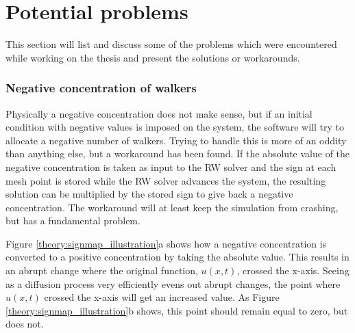\section{Potential problems}\label{problems_and_pitfalls}
 
 This section will list and discuss some of the problems which were encountered while working on the thesis and present the solutions or workarounds.

% 


 
\subsubsection{Negative concentration of walkers}
Physically a negative concentration does not make sense, but if an initial condition with negative values is imposed on the system, the software will try to allocate a negative number of walkers. 
Trying to handle this is more of an oddity than anything else, but a workaround has been found. 
If the absolute value of the negative concentration is taken as input to the RW solver and the sign at each mesh point is stored while the RW solver advances the system, the resulting solution can be multiplied by the stored sign to give back a negative concentration. 
The workaround will at least keep the simulation from crashing, but has a fundamental problem. 

Figure \ref{theory:signmap_illustration}a shows how a negative concentration is converted to a positive concentration by taking the absolute value. This results in an abrupt change where the original function, $u(x,t)$, crossed the x-axis. Seeing as a diffusion process very efficiently evens out abrupt changes, the point where $u(x,t)$ crossed the x-axis will get an increased value. As Figure \ref{theory:signmap_illustration}b shows, this point should remain equal to zero, but does not.

